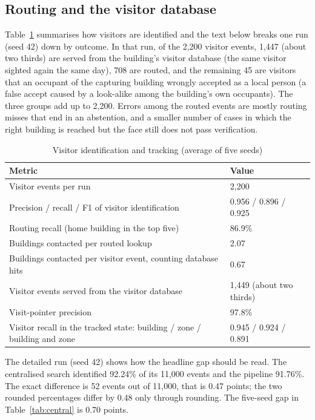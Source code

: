 \documentclass[12pt,a4paper,oneside]{report}
\begin{document}
\subsection{Routing and the visitor database}\label{sec:res-visitors}
Table~\ref{tab:visitors} summarises how visitors are identified and the text below breaks one run (seed 42) down by outcome. In that run, of the 2,200 visitor events, 1,447 (about two thirds) are served from the building's visitor database (the same visitor sighted again the same day), 708 are routed, and the remaining 45 are visitors that an occupant of the capturing building wrongly accepted as a local person (a false accept caused by a look-alike among the building's own occupants). The three groups add up to 2,200. Errors among the routed events are mostly routing misses that end in an abstention, and a smaller number of cases in which the right building is reached but the face still does not pass verification.

\begin{table}[htbp]
\centering
\caption{Visitor identification and tracking (average of five seeds)}\label{tab:visitors}
{\small\setlength{\tabcolsep}{4pt}\renewcommand{\arraystretch}{1.2}
\begin{tabular}{|p{8.4cm}|p{3.0cm}|}\hline
\textbf{Metric} & \textbf{Value}\\\hline
Visitor events per run & 2,200\\\hline
Precision / recall / F1 of visitor identification & 0.956 / 0.896 / 0.925\\\hline
Routing recall (home building in the top five) & 86.9\%\\\hline
Buildings contacted per routed lookup & 2.07\\\hline
Buildings contacted per visitor event, counting database hits & 0.67\\\hline
Visitor events served from the visitor database & 1,449 (about two thirds)\\\hline
Visit-pointer precision & 97.8\%\\\hline
Visitor recall in the tracked state: building / zone / building and zone & 0.945 / 0.924 / 0.891\\\hline
\end{tabular}}
\end{table}



The detailed run (seed 42) shows how the headline gap should be read. The centralised search identified 92.24\% of its 11,000 events and the pipeline 91.76\%. The exact difference is 52 events out of 11,000, that is 0.47 points; the two rounded percentages differ by 0.48 only through rounding. The five-seed gap in Table~\ref{tab:central} is 0.70 points.
\end{document}
